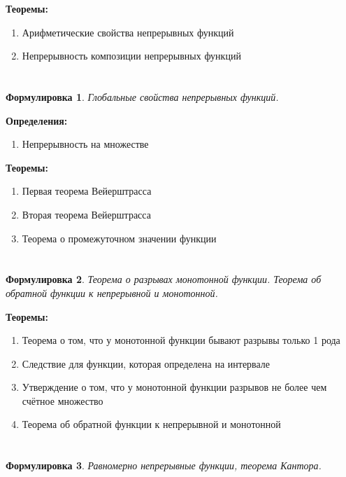 \documentclass[a4paper]{article}
\theoremstyle{plain}
\newtheorem*{st}{Формулировка}
\theoremstyle{definition}
\theoremstyle{remark}
\begin{document}
\textbf{Теоремы:}
\begin{enumerate}
    \item Арифметические свойства непрерывных функций
    \item Непрерывность композиции непрерывных функций
\end{enumerate}


\section{}
\begin{st}
    Глобальные свойства непрерывных функций.
\end{st}

\textbf{Определения:}
\begin{enumerate}
    \item Непрерывность на множестве
\end{enumerate}

\textbf{Теоремы:}
\begin{enumerate}
    \item Первая теорема Вейерштрасса
    \item Вторая теорема Вейерштрасса
    \item Теорема о промежуточном значении функции
\end{enumerate}


\section{}
\begin{st}
    Теорема о разрывах монотонной функции. Теорема об обратной функции к непрерывной и монотонной.
\end{st}

\textbf{Теоремы:}
\begin{enumerate}
    \item Теорема о том, что у монотонной функции бывают разрывы только 1 рода
    \item Следствие для функции, которая определена на интервале
    \item Утверждение о том, что у монотонной функции разрывов не более чем счётное множество
    \item Теорема об обратной функции к непрерывной и монотонной
\end{enumerate}


\section{}
\begin{st}
    Равномерно непрерывные функции, теорема Кантора.
\end{st}
\end{document}

